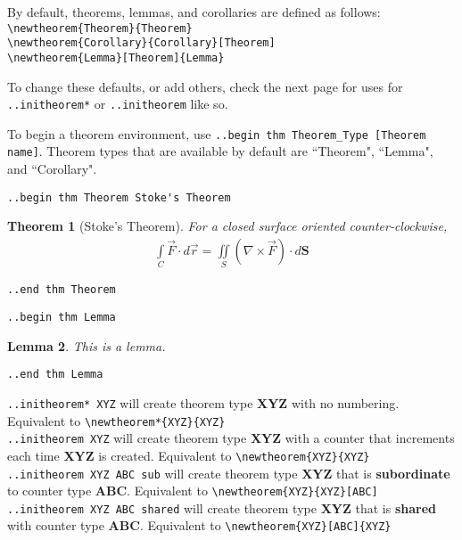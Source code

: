 \documentclass[12pt]{article}
\newtheorem{Theorem}{Theorem}
\newtheorem{Lemma}[Theorem]{Lemma}
\begin{document}
\begin{flushleft}

By default, theorems, lemmas, and corollaries are defined as follows: \\
\verb|\newtheorem{Theorem}{Theorem}|\\
\verb|\newtheorem{Corollary}{Corollary}[Theorem]|\\
\verb|\newtheorem{Lemma}[Theorem]{Lemma}|\\

\bigskip

To change these defaults, or add others, check the next page for uses for \verb|..initheorem*| or \verb|..initheorem| like so.

\bigskip

To begin a theorem environment, use \verb|..begin thm Theorem_Type [Theorem name]|. Theorem types that are available by default are ``Theorem", ``Lemma", and ``Corollary".

\bigskip
\bigskip

\verb|..begin thm Theorem Stoke's Theorem|
\begin{Theorem}[Stoke's Theorem]
For a closed surface oriented counter-clockwise,
\begin{gather*}
\int\limits_C \vec{F} \cdot d\vec{r} = \iint\limits_S (\nabla \times \vec{F}) \cdot d\textbf{S} 
\end{gather*}
\end{Theorem}
\verb|..end thm Theorem|

\bigskip
\bigskip

\verb|..begin thm Lemma|
\begin{Lemma}
This is a lemma.
\end{Lemma}
\verb|..end thm Lemma|

\newpage

\verb|..initheorem* XYZ| will create theorem type \textbf{XYZ} with no numbering. Equivalent to \verb|\newtheorem*{XYZ}{XYZ}|\\
\verb|..initheorem XYZ| will create theorem type \textbf{XYZ} with a counter that increments each time \textbf{XYZ} is created. Equivalent to \verb|\newtheorem{XYZ}{XYZ}|\\
\verb|..initheorem XYZ ABC sub| will create theorem type \textbf{XYZ} that is \textbf{subordinate} to counter type \textbf{ABC}. Equivalent to \verb|\newtheorem{XYZ}{XYZ}[ABC]|\\
\verb|..initheorem XYZ ABC shared| will create theorem type \textbf{XYZ} that is \textbf{shared} with counter type \textbf{ABC}. Equivalent to \verb|\newtheorem{XYZ}[ABC]{XYZ}|\\

\end{flushleft}
\end{document}
